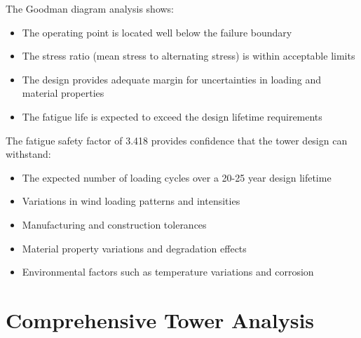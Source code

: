 \documentclass[12pt]{article}
\begin{document}
The Goodman diagram analysis shows:
\begin{itemize}
    \item The operating point is located well below the failure boundary
    \item The stress ratio (mean stress to alternating stress) is within acceptable limits
    \item The design provides adequate margin for uncertainties in loading and material properties
    \item The fatigue life is expected to exceed the design lifetime requirements
\end{itemize}

The fatigue safety factor of 3.418 provides confidence that the tower design can withstand:
\begin{itemize}
    \item The expected number of loading cycles over a 20-25 year design lifetime
    \item Variations in wind loading patterns and intensities
    \item Manufacturing and construction tolerances
    \item Material property variations and degradation effects
    \item Environmental factors such as temperature variations and corrosion
\end{itemize}

\section{Comprehensive Tower Analysis}
\end{document}
